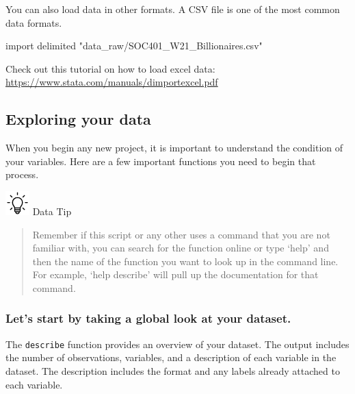 \documentclass[
]{book}
\newenvironment{Shaded}{\begin{snugshade}}{\end{snugshade}}
\newcommand{\NormalTok}[1]{#1}
\newcommand{\StringTok}[1]{\textcolor[rgb]{0.31,0.60,0.02}{#1}}
\begin{document}
You can also load data in other formats. A CSV file is one of the most common data formats.

\begin{Shaded}
\begin{Highlighting}[]
\NormalTok{import delimited }\StringTok{"data\_raw/SOC401\_W21\_Billionaires.csv"}
\end{Highlighting}
\end{Shaded}

Check out this tutorial on how to load excel data:
\url{https://www.stata.com/manuals/dimportexcel.pdf}

\hypertarget{exploring-your-data}{%
\subsection*{Exploring your data}\label{exploring-your-data}}

When you begin any new project, it is important to understand the condition of your variables. Here are a few important functions you need to begin that process.

\includegraphics[width=0.36458in,height=\textheight]{images/bulb.png} Data Tip

\begin{quote}
Remember if this script or any other uses a command that you are not familiar with, you can search for the function online or type `help' and then the name of the function you want to look up in the command line. For example, `help describe' will pull up the documentation for that command.
\end{quote}

\hypertarget{describe}{%
\subsubsection*{Let's start by taking a global look at your dataset.}\label{describe}}

The \texttt{describe} function provides an overview of your dataset. The output includes the number of observations, variables, and a description of each variable in the dataset. The description includes the format and any labels already attached to each variable.
\end{document}
